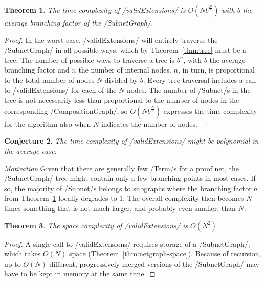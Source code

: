 \documentclass[12pt,a4paper]{article}
\newtheorem{theorem}{Theorem}
\newtheorem{conjecture}[theorem]{Conjecture}
\begin{document}
\begin{theorem}\label{thm:exponential}
    The time complexity of \hs/validExtensions/ is $O(Nb^{\frac{N}{b}})$ with $b$ the average branching factor of the \hs/SubnetGraph/.
\end{theorem}
\begin{proof}
    In the worst case, \hs/validExtensions/ will entirely traverse the \hs/SubnetGraph/ in all possible ways, which by Theorem~\ref{thm:tree} must be a tree. The number of possible ways to traverse a tree is $b^n$, with $b$ the average branching factor and $n$ the number of internal nodes. $n$, in turn, is proportional to the total number of nodes $N$ divided by $b$. Every tree traversal includes a call to \hs/validExtensions/ for each of the $N$ nodes. The number of \hs/Subnet/s in the tree is not necessarily less than proportional to the number of nodes in the corresponding \hs/CompositionGraph/, so $O(Nb^{\frac{N}{b}})$ expresses the time complexity for the algorithm also when $N$ indicates the number of nodes.
\end{proof}

\begin{conjecture}\label{cnj:polynomial}
    The time complexity of \hs/validExtensions/ might be polynomial in the average case.
\end{conjecture}
\noindent\emph{Motivation.}\hspace{6pt}Given that there are generally few \hs/Term/s for a proof net, the \hs/SubnetGraph/ tree might contain only a few branching points in most cases. If so, the majority of \hs/Subnet/s belongs to subgraphs where the branching factor $b$ from Theorem~\ref{thm:exponential} locally degrades to 1. The overall complexity then becomes $N$ times something that is not much larger, and probably even smaller, than $N$.

\begin{theorem}\label{thm:extend-space}
    The space complexity of \hs/validExtensions/ is $O(N^2)$.
\end{theorem}
\begin{proof}
    A single call to \hs/validExtensions/ requires storage of a \hs/SubnetGraph/, which takes $O(N)$ space (Theorem~\ref{thm:netgraph-space}). Because of recursion, up to $O(N)$ different, progressively merged versions of the \hs/SubnetGraph/ may have to be kept in memory at the same time.
\end{proof}
\end{document}
